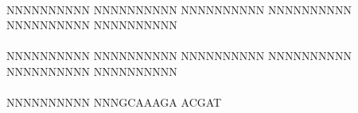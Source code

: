 \documentclass[11pt,twoside,reqno,a4paper]{article}
\begin{document}
{\hspace*{1\charwidth}\hspace*{1\charwidth}\hspace*{1\charwidth}\hspace*{1\charwidth}\hspace*{1\charwidth}\hspace*{1\charwidth}\\
NNNNNNNNNN	NNNNNNNNNN	NNNNNNNNNN	NNNNNNNNNN	NNNNNNNNNN	NNNNNNNNNN	\\
\hspace*{1\charwidth}\hspace*{1\charwidth}\hspace*{1\charwidth}\hspace*{1\charwidth}\hspace*{1\charwidth}\hspace*{1\charwidth}\\
NNNNNNNNNN	NNNNNNNNNN	NNNNNNNNNN	NNNNNNNNNN	NNNNNNNNNN	NNNNNNNNNN	\\
\hspace*{1\charwidth}\hspace*{1\charwidth}\hspace*{1\charwidth}\hspace*{1\charwidth}\hspace*{1\charwidth}\hspace*{1\charwidth}\\
NNNNNNNNNN	NNNGCAAAGA	ACGAT\\
\hspace*{1\charwidth}\hspace*{1\charwidth}\\
\\
\\
\\
\\
\\
\\
\\
\\
\\
\\
\\
\\
\\
\\
\\
\\
\\
\\
\\
\\
\\
\\
}
\end{document}
